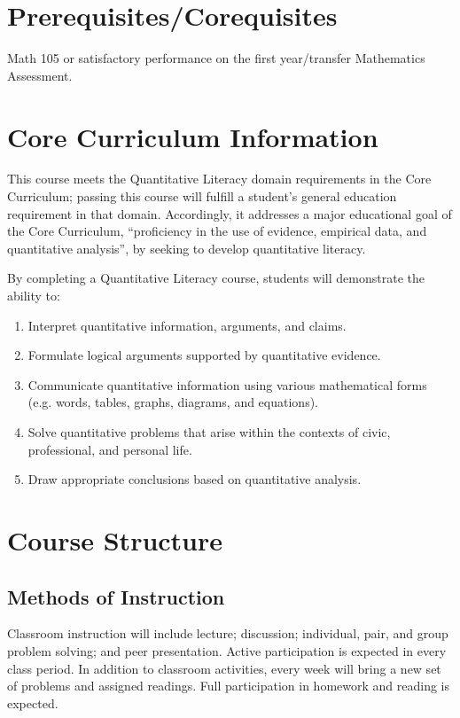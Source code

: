 \documentclass[11pt]{article}
\begin{document}

\section*{Prerequisites/Corequisites}
Math 105 or satisfactory performance on the first year/transfer
Mathematics Assessment.

\section*{Core Curriculum Information}

This course meets the Quantitative Literacy domain requirements in the Core Curriculum; passing this course will fulfill a student's general education requirement in that domain. Accordingly, it addresses a major educational goal of the Core Curriculum, ``proficiency in the use of evidence, empirical data, and quantitative analysis'', by seeking to develop quantitative literacy.

By completing a Quantitative Literacy course, students will demonstrate the ability to:
\begin{enumerate}
    \item Interpret quantitative information, arguments, and claims.

    \item Formulate logical arguments supported by quantitative evidence.

    \item Communicate quantitative information using various mathematical forms (e.g. words, tables, graphs, diagrams, and equations).

    \item Solve quantitative problems that arise within the contexts of civic, professional, and personal life.

    \item Draw appropriate conclusions based on quantitative analysis.
\end{enumerate}

\section*{Course Structure}

\subsection*{Methods of Instruction}
Classroom instruction will include lecture; discussion; individual,
pair, and group problem solving; and peer presentation. Active participation is expected in every class period. In addition to classroom activities, every week will bring a new set of problems and assigned readings.  Full participation in homework and reading is expected.
\end{document}
